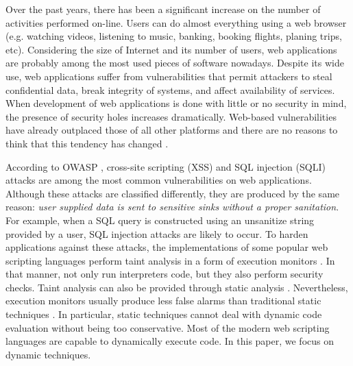 \documentclass[oribibl]{llncs}
\begin{document}
Over the past years, there has been a significant increase 
on the number of activities performed on-line.
Users can do almost everything  
using a web browser (e.g. 
watching videos, listening to music, banking, booking flights, planing 
trips, etc). Considering the size of Internet and its number of users, 
web applications are probably among the most used pieces of
software nowadays.
Despite its wide use, web applications suffer 
from vulnerabilities that permit attackers to 
steal confidential data, break integrity of systems, 
and affect availability of services. 
When development of web applications is done 
with little or no
security in mind,  
the presence of security holes increases dramatically.
Web-based vulnerabilities have already  
outplaced those of all other platforms 
\cite{StateWebSecurity} 
and there are 
no reasons to think that this tendency has changed
\cite{FFAWebSecurity}.

According to OWASP \cite{OWASP:Top10:2007}, 
cross-site scripting (XSS) and SQL injection (SQLI) attacks are among 
the most common vulnerabilities on web applications.
Although these attacks are classified differently, they are produced 
by the same 
reason: \emph{user supplied data is sent to sensitive sinks 
without a proper sanitation}.
For example, 
when a SQL query is constructed using an unsanitize string provided by a user, 
SQL injection attacks are likely to occur.
To harden applications against these attacks, 
the implementations of some popular web scripting languages 
perform taint analysis in a form 
of execution monitors \cite{Perl,Ruby}. In that manner, not only run 
interpreters code, but they also perform security checks. Taint
analysis can also be provided through static analysis \cite{WebSSARI,Jovanovic06pixy:a}. 
Nevertheless, execution monitors usually produce
less false alarms 
than traditional static techniques
\cite{Sabelfeld:Russo:PSI09}. 
In particular, static techniques cannot  
deal with dynamic code evaluation
without being too conservative. Most of the modern web scripting 
languages are capable to dynamically execute code. 
In this paper, we focus on dynamic techniques.
\end{document}
